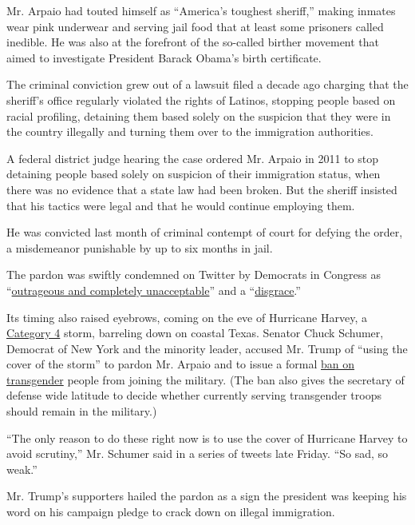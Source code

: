 Mr. Arpaio had touted himself as ``America's toughest sheriff,'' making
inmates wear pink underwear and serving jail food that at least some
prisoners called inedible. He was also at the forefront of the so-called
birther movement that aimed to investigate President Barack Obama's
birth certificate.

The criminal conviction grew out of a lawsuit filed a decade ago
charging that the sheriff's office regularly violated the rights of
Latinos, stopping people based on racial profiling, detaining them based
solely on the suspicion that they were in the country illegally and
turning them over to the immigration authorities.

A federal district judge hearing the case ordered Mr. Arpaio in 2011 to
stop detaining people based solely on suspicion of their immigration
status, when there was no evidence that a state law had been broken. But
the sheriff insisted that his tactics were legal and that he would
continue employing them.

He was convicted last month of criminal contempt of court for defying
the order, a misdemeanor punishable by up to six months in jail.

The pardon was swiftly condemned on Twitter by Democrats in Congress as
``\href{https://twitter.com/repmarkpocan/status/901234877873442816}{outrageous
and completely unacceptable}'' and a
``\href{https://twitter.com/RepKClark/status/901236788735467521}{disgrace}.''

Its timing also raised eyebrows, coming on the eve of Hurricane Harvey,
a
\href{https://www.nytimes3xbfgragh.onion/2017/08/25/us/hurricane-harvey.html}{Category
4} storm, barreling down on coastal Texas. Senator Chuck Schumer,
Democrat of New York and the minority leader, accused Mr. Trump of
``using the cover of the storm'' to pardon Mr. Arpaio and to issue a
formal
\href{https://www.nytimes3xbfgragh.onion/2017/08/25/us/politics/trump-mattis-transgender-ban.html?hp\&action=click\&pgtype=Homepage\&clickSource=story-heading\&module=first-column-region\&region=top-news\&WT.nav=top-news}{ban
on transgender} people from joining the military. (The ban also gives
the secretary of defense wide latitude to decide whether currently
serving transgender troops should remain in the military.)

``The only reason to do these right now is to use the cover of Hurricane
Harvey to avoid scrutiny,'' Mr. Schumer said in a series of tweets late
Friday. ``So sad, so weak.''

Mr. Trump's supporters hailed the pardon as a sign the president was
keeping his word on his campaign pledge to crack down on illegal
immigration.

